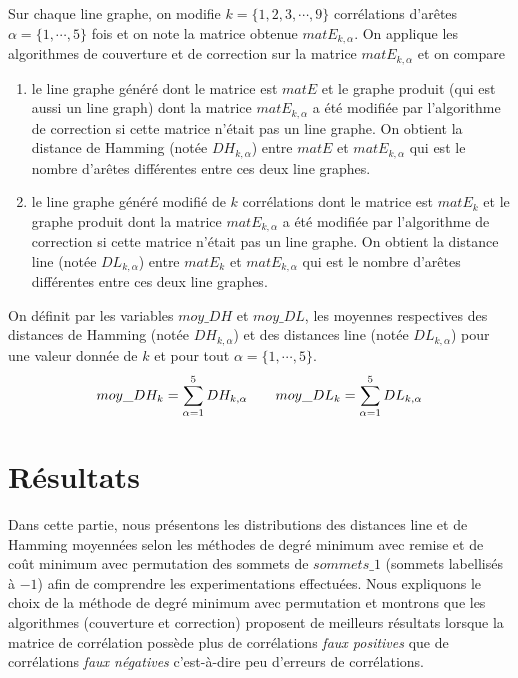 \documentclass[onecolumn, 12pt]{book}
\begin{document}
  


Sur chaque line graphe, on modifie $k = \{1,2,3,\cdots, 9\}$ corr\'elations d'ar\^etes $\alpha = \{1, \cdots, 5\}$ fois et on note la matrice obtenue $matE_{k, \alpha}$.
On applique les algorithmes de couverture et de correction sur la matrice $matE_{k, \alpha}$ et on compare 
\begin{enumerate}
\item le line graphe g\'en\'er\'e dont le matrice est  $matE$ et le graphe produit (qui est aussi un line graph) dont la matrice $matE_{k, \alpha}$ a \'et\'e modifi\'ee par l'algorithme de correction si cette matrice n'\'etait pas un line graphe. On obtient la distance de Hamming (not\'ee $DH_{k,\alpha}$) entre $matE$ et $matE_{k, \alpha}$ qui est le nombre d'ar\^etes diff\'erentes entre ces deux line graphes.
\item  le line graphe g\'en\'er\'e modifi\'e de $k$ corr\'elations dont le matrice est  $matE_k$ et le graphe produit dont la matrice $matE_{k, \alpha}$ a \'et\'e modifi\'ee par l'algorithme de correction si cette matrice n'\'etait pas un line graphe. On obtient la distance line (not\'ee $DL_{k,\alpha}$) entre $matE_k$ et $matE_{k, \alpha}$ qui est le nombre d'ar\^etes diff\'erentes entre ces deux line graphes.
\end{enumerate}
On d\'efinit par les variables $moy\_DH$ et $moy\_DL$, les moyennes respectives des distances de Hamming (not\'ee $DH_{k,\alpha}$) et des distances line (not\'ee $DL_{k,\alpha}$) pour une valeur donn\'ee de $k$ et pour tout $\alpha = \{1, \cdots, 5\}$.
\begin{equation}
moy\_DH_k = \sum_{\alpha = 1}^{5} DH_{k, \alpha} \hspace{2 em}
moy\_DL_k = \sum_{\alpha = 1}^{5} DL_{k, \alpha}
\end{equation}

  
\section{R\'esultats}
Dans cette partie, nous pr\'esentons les distributions des distances line et de Hamming moyenn\'ees selon les m\'ethodes de degr\'e minimum avec remise et de co\^ut minimum avec permutation des sommets de $sommets\_1$ (sommets labellis\'es \`a $-1$) afin de comprendre les experimentations effectu\'ees. 
Nous expliquons le choix de la m\'ethode de degr\'e minimum avec permutation et montrons que les algorithmes (couverture et correction) proposent de meilleurs r\'esultats lorsque la matrice de corr\'elation poss\`ede plus de corr\'elations {\em faux positives} que de corr\'elations {\em faux n\'egatives} c'est-\`a-dire peu d'erreurs de corr\'elations.   
\end{document}
